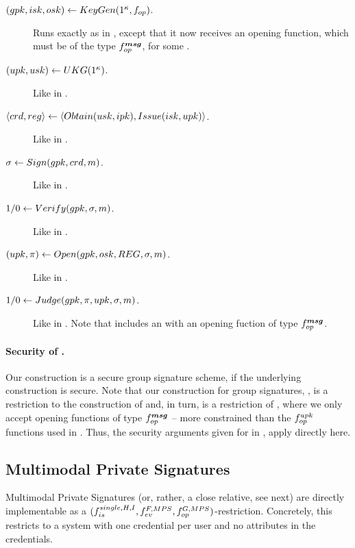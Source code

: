 \begin{description}
\item[$(gpk,isk,osk) \gets KeyGen(1^\kappa,f_{op})$.] Runs exactly as in
  \CUASGS, except that it now receives an opening function, which must be of
  the type $f_{op}^{\boldsymbol{msg}}$, for some \smsg.
\item[$(upk,usk) \gets UKG(1^\kappa)$.] Like in \CUASGS.  
\item[$\langle crd,reg \rangle \gets
  \langle Obtain(usk,ipk),Issue(isk,upk)\rangle$.] Like in \CUASGS.
\item[$\sigma \gets Sign(gpk,crd,m)$.] Like in \CUASGS.
\item[$1/0 \gets Verify(gpk,\sigma,m)$.] Like in \CUASGS.
\item[$(\upk,\pi) \gets \Open(\gpk,\osk,\trans,\sig,\msg)$.] Like in
  \CUASGS.
\item[$1/0 \gets Judge(gpk,\pi,upk,\sigma,m)$.] Like in \CUASGen. Note that
  \gpk includes an \opk with an opening fuction of type $f_{op}^{\boldsymbol{msg}}$.
\end{description}

\paragraph{Security of \CUASGSMDO.} %
Our \CUASGSMDO construction is a secure group signature scheme, if the
underlying \CUASGen construction is secure.
%
Note that our construction for group signatures, \CUASGS, is a restriction to
the construction of \CUASGen and, in turn, \CUASGSMDO is a restriction of
\CUASGS, where we only accept opening functions of type $f_{op}^{\boldsymbol{msg}}$ --
more constrained than the $f_{op}^{upk}$ functions used in \CUASGS. Thus, the
security arguments given for \CUASGS in , apply
directly here.

\subsection{Multimodal Private Signatures}
\label{ssec:related-models-mps}

Multimodal Private Signatures (or, rather, a close relative, see next) are
directly implementable as a $(f_{is}^{single,H,I},f_{ev}^{F,MPS},
f_{op}^{G,MPS})$-\CUASGen restriction. Concretely, this restricts to a system
with one credential per user and no attributes in the credentials.


